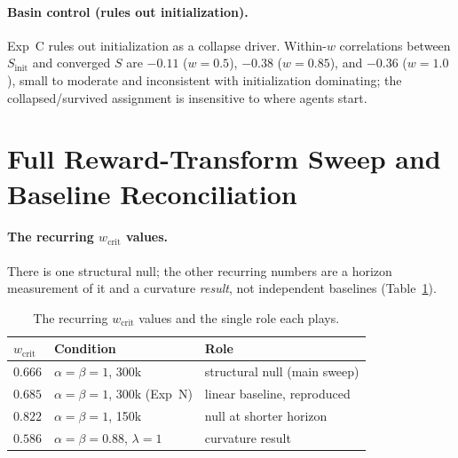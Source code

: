\documentclass[letterpaper]{article} %
\theoremstyle{plain}
\newcommand{\wcrit}{w_{\mathrm{crit}}}
\begin{document}
\paragraph{Basin control (rules out initialization).}
Exp~C rules out initialization as a collapse driver. Within-$w$ correlations between
$S_{\mathrm{init}}$ and converged $S$ are $-0.11$ ($w{=}0.5$), $-0.38$ ($w{=}0.85$), and
$-0.36$ ($w{=}1.0$), small to moderate and inconsistent with initialization dominating; the
collapsed/survived assignment is insensitive to where agents start.

\section{Full Reward-Transform Sweep and Baseline Reconciliation}
\label{sec:s_results}

\paragraph{The recurring $\wcrit$ values.}
There is one structural null; the other recurring numbers are a horizon measurement of it and
a curvature \emph{result}, not independent baselines (Table~\ref{tab:baselines}).

\begin{table}[t]
\centering
\caption{The recurring $\wcrit$ values and the single role each plays.}
\label{tab:baselines}
\small
\begin{tabular}{lll}
\toprule
$\wcrit$ & Condition & Role \\
\midrule
$0.666$ & $\alpha{=}\beta{=}1$, 300k & structural null (main sweep) \\
$0.685$ & $\alpha{=}\beta{=}1$, 300k (Exp~N) & linear baseline, reproduced \\
$0.822$ & $\alpha{=}\beta{=}1$, 150k & null at shorter horizon \\
$0.586$ & $\alpha{=}\beta{=}0.88$, $\lambda{=}1$ & curvature result \\
\bottomrule
\end{tabular}
\end{table}
\end{document}
